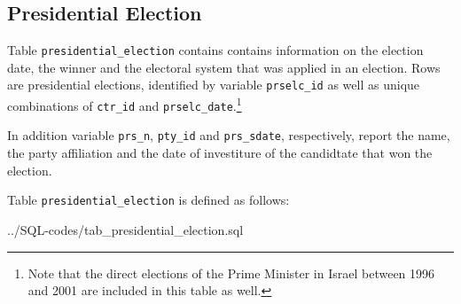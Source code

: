 \subsection{Presidential Election}\label{subsec_tab_presidential_election}
Table \texttt{\footnotesize presidential\_election} contains contains information on the election date, the winner and the electoral system that was applied in an election. 
Rows are presidential elections, identified by variable \texttt{\footnotesize prselc\_id} as well as unique combinations of \texttt{\footnotesize ctr\_id} and \texttt{\footnotesize prselc\_date}.\footnote{Note that the direct elections of the Prime Minister in Israel between 1996 and 2001 are included in this table as well.}

In addition variable \texttt{\footnotesize prs\_n}, \texttt{\footnotesize pty\_id} and \texttt{\footnotesize prs\_sdate}, respectively, report the name, the party affiliation and the date of investiture of the candidtate that won the election. 

Table \texttt{\footnotesize presidential\_election} is defined as follows: 

%
{../SQL-codes/tab_presidential_election.sql}

